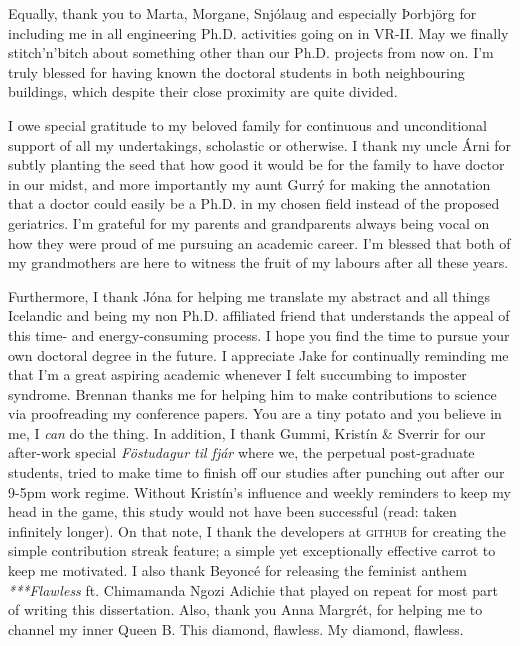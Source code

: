 Equally, thank you to Marta, Morgane, Snjólaug and especially Þorbjörg for 
including me in all engineering Ph.D. activities going on in VR-II. 
May we finally stitch'n'bitch about something other than our Ph.D. projects 
from now on.  
I'm truly blessed for having known the doctoral students in both neighbouring 
buildings, which despite their close proximity are quite divided.

I owe special gratitude to my beloved family for continuous and unconditional 
support of all my undertakings, scholastic or otherwise. 
I thank my uncle Árni for subtly planting the seed that how good it would be 
for the family to have doctor in our midst, and more importantly my aunt Gurrý 
for making the annotation that a doctor could easily be a Ph.D. in my chosen 
field instead of the proposed geriatrics.
I'm grateful for my parents and grandparents always being vocal on how they 
were proud of me pursuing an academic career. I'm blessed that both of my 
grandmothers are here to witness the fruit of my labours after all these years. 

Furthermore, I thank Jóna for helping me translate my abstract and all things 
Icelandic and being my non Ph.D. affiliated friend that understands the appeal 
of this time- and energy-consuming process. I hope you find the time to pursue 
your own doctoral degree in the future.
I appreciate Jake for continually reminding me that I'm a great aspiring 
academic whenever I felt succumbing to imposter syndrome.
Brennan thanks me for helping him to make contributions to science via 
proofreading my conference papers. You are a tiny potato and you believe in me, 
I \emph{can} do the thing.
In addition, I thank Gummi, Kristín \& Sverrir for our after-work special 
\emph{Föstudagur til fjár} where we, the perpetual post-graduate students, 
tried to make time to finish off our studies after punching out after our 9-5pm 
work regime. 
Without Kristín's influence and weekly reminders to keep my head in the game, 
this study would not have been successful (read: taken infinitely longer). 
On that note, I thank the developers at \textsc{github} for creating the simple 
contribution streak feature; a simple yet exceptionally effective carrot to 
keep me motivated.
I also thank Beyoncé for releasing the feminist anthem \emph{***Flawless} ft. 
Chimamanda Ngozi Adichie that played on repeat for most part of writing this 
dissertation. Also, thank you Anna Margrét, for helping me to channel my inner 
Queen B. This diamond, flawless. My diamond, flawless.

